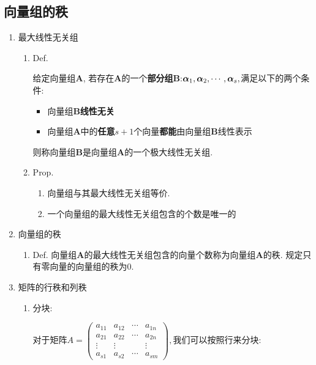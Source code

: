 \subsection{向量组的秩}
\begin{enumerate}
\item 最大线性无关组
\begin{enumerate}
\item Def. %
\noindent\begin{minipage}[t]{1\columnwidth}%
给定向量组$\boldsymbol{A}$, 若存在$\boldsymbol{A}$的一个\textbf{部分组}$\boldsymbol{B}$:$\boldsymbol{\alpha}_{1},\boldsymbol{\alpha}_{2},\cdots,\boldsymbol{\alpha}_{s},$满足以下的两个条件:
\begin{itemize}
\item 向量组$\boldsymbol{B}$\textbf{线性无关}
\item 向量组$\boldsymbol{A}$中的\textbf{任意}$s+1$个向量\textbf{都能}由向量组$\boldsymbol{B}$线性表示
\end{itemize}
则称向量组$\boldsymbol{B}$是向量组$\boldsymbol{A}$的一个极大线性无关组. %
\end{minipage}
\item Prop.
\begin{enumerate}
\item 向量组与其最大线性无关组等价.
\item 一个向量组的最大线性无关组包含的个数是唯一的
\end{enumerate}
\end{enumerate}
\item 向量组的秩
\begin{enumerate}
\item Def. 向量组$\boldsymbol{A}$的最大线性无关组包含的向量个数称为向量组$\boldsymbol{A}$的秩.
规定只有零向量的向量组的秩为$0$.
\end{enumerate}
\item 矩阵的行秩和列秩
\begin{enumerate}
\item 分块: %
\noindent\begin{minipage}[t]{1\columnwidth}%
对于矩阵$A=\begin{pmatrix}a_{11} & a_{12} & \cdots & a_{1n}\\
a_{21} & a_{22} & \cdots & a_{2n}\\
\vdots & \vdots &  & \vdots\\
a_{s1} & a_{s2} & \cdots & a_{sm}
\end{pmatrix},$我们可以按照行来分块:


\end{minipage}
\end{enumerate}
\end{enumerate}
